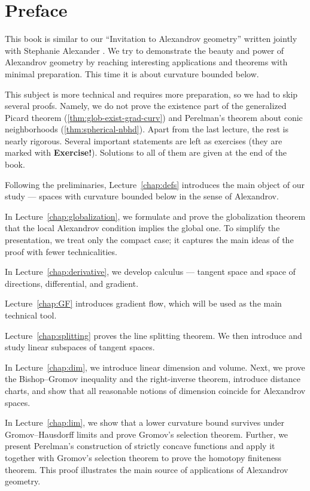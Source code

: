 \chapter*{Preface}

This book is similar to our ``Invitation to Alexandrov geometry'' written jointly with Stephanie Alexander \cite{alexander-kapovitch-petrunin-2019}.
We try to demonstrate the beauty and power of Alexandrov geometry by reaching interesting applications and theorems with minimal preparation.
This time it is about curvature bounded below.

This subject is more technical and requires more preparation, so we had to skip several proofs.
Namely, we do not prove the existence part of the generalized Picard theorem (\ref{thm:glob-exist-grad-curv})
and Perelman's theorem about conic neighborhoods (\ref{thm:spherical-nbhd}).
Apart from the last lecture, the rest is nearly rigorous.
Several important statements are left as exercises (they are marked with \textbf{Exercise!}).
Solutions to all of them are given at the end of the book.

\medskip

Following the preliminaries, Lecture~\ref{chap:defs} introduces the main object of our study --- spaces with curvature bounded below in the sense of Alexandrov.

In Lecture~\ref{chap:globalization}, we formulate and prove the globalization theorem that the local Alexandrov condition implies the global one.
To simplify the presentation, we treat only the compact case; it captures the main ideas of the proof with fewer technicalities.

In Lecture~\ref{chap:derivative}, we develop calculus --- tangent space and space of directions, differential, and gradient.

Lecture~\ref{chap:GF} introduces gradient flow, which will be used as the main technical tool.

Lecture~\ref{chap:splitting} proves the line splitting theorem.
We then introduce and study linear subspaces of tangent spaces.

In Lecture~\ref{chap:dim}, we introduce linear dimension and volume.
Next, we prove the Bishop--Gromov inequality and the right-inverse theorem,
introduce distance charts, and show that all reasonable notions of dimension coincide for Alexandrov spaces.

In Lecture~\ref{chap:lim}, we show that a lower curvature bound survives under Gromov--Hausdorff limits and prove Gromov's selection theorem.
Further, we present Perelman's construction of strictly concave functions and
apply it together with Gromov's selection theorem to prove the homotopy finiteness theorem.
This proof illustrates the main source of applications of Alexandrov geometry.

